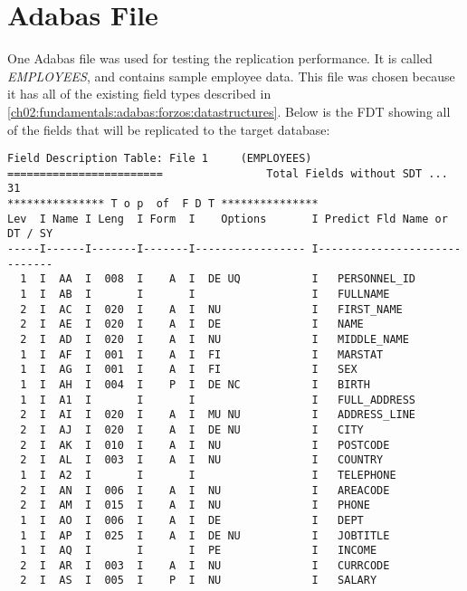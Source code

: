\section{Adabas File}
\label{ch05:methodology:adabasfile}
One Adabas file was used for testing the replication performance. It is called \textit{EMPLOYEES}, and contains sample employee data. This file was chosen because it has all of the existing field types described in \ref{ch02:fundamentals:adabas:forzos:datastructures}. Below is the \ac{FDT} showing all of the fields that will be replicated to the target database:
\begin{verbatim}
Field Description Table: File 1     (EMPLOYEES)                              
========================                Total Fields without SDT ... 31      
*************** T o p  of  F D T ***************                             
Lev  I Name I Leng  I Form  I    Options       I Predict Fld Name or DT / SY 
-----I------I-------I-------I----------------- I-----------------------------
  1  I  AA  I  008  I    A  I  DE UQ           I   PERSONNEL_ID              
  1  I  AB  I       I       I                  I   FULLNAME                  
  2  I  AC  I  020  I    A  I  NU              I   FIRST_NAME                
  2  I  AE  I  020  I    A  I  DE              I   NAME                      
  2  I  AD  I  020  I    A  I  NU              I   MIDDLE_NAME               
  1  I  AF  I  001  I    A  I  FI              I   MARSTAT                   
  1  I  AG  I  001  I    A  I  FI              I   SEX                       
  1  I  AH  I  004  I    P  I  DE NC           I   BIRTH                     
  1  I  A1  I       I       I                  I   FULL_ADDRESS              
  2  I  AI  I  020  I    A  I  MU NU           I   ADDRESS_LINE              
  2  I  AJ  I  020  I    A  I  DE NU           I   CITY                      
  2  I  AK  I  010  I    A  I  NU              I   POSTCODE                  
  2  I  AL  I  003  I    A  I  NU              I   COUNTRY                   
  1  I  A2  I       I       I                  I   TELEPHONE                 
  2  I  AN  I  006  I    A  I  NU              I   AREACODE                  
  2  I  AM  I  015  I    A  I  NU              I   PHONE                     
  1  I  AO  I  006  I    A  I  DE              I   DEPT                      
  1  I  AP  I  025  I    A  I  DE NU           I   JOBTITLE                  
  1  I  AQ  I       I       I  PE              I   INCOME                    
  2  I  AR  I  003  I    A  I  NU              I   CURRCODE                  
  2  I  AS  I  005  I    P  I  NU              I   SALARY                    

\end{verbatim}
